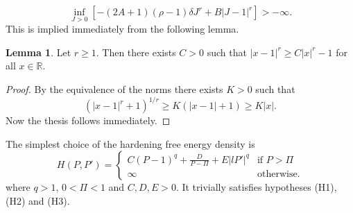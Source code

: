 \documentclass[a4paper,10pt,twoside]{amsbook}
\numberwithin{section}{chapter}
\numberwithin{equation}{chapter}
\theoremstyle{definition}
\newtheorem{lemma}[prop]{Lemma}
\begin{document}
\[
\inf_{J>0}\left[-(2A+1)(\rho-1)\delta J^r+B|J-1|^r\right]>-\infty.
\]
This is implied immediately from the following lemma.
\begin{lemma}
Let $r\ge1$. Then there exists $C>0$ such that $|x-1|^r\ge C|x|^r-1$ for all $x\in\mathbb{R}$.
\end{lemma}
\begin{proof}
By the equivalence of the norms there exists $K>0$ such that
\[
(|x-1|^r+1)^{1/r}\ge K(|x-1|+1)\ge K|x|.
\]
Now the thesis follows immediately.
\end{proof}
The simplest choice of the hardening free energy density is
\[
H(P,P')=
\begin{cases}
C(P-1)^q+\frac{D}{P-\Pi}+E|lP'|^q & \text{if $P>\Pi$} \\
\infty & \text{otherwise}.
\end{cases}
\]
where $q>1$, $0<\Pi<1$ and $C,D,E>0$. It trivially satisfies hypotheses (H1), (H2) and (H3).
\end{document}
